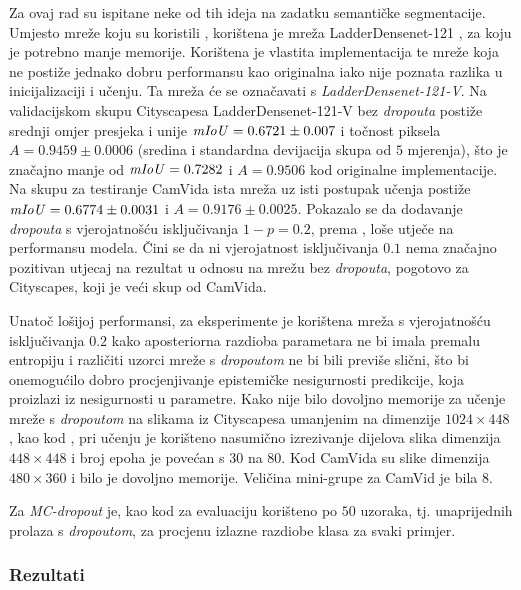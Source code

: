\documentclass[utf8, diplomski, lmodern]{fer}
\begin{document}
Za ovaj rad su ispitane neke od tih ideja na zadatku semantičke segmentacije. Umjesto mreže koju su koristili \citet{Kendall:2017:WUNBDLCV}, korištena je mreža LadderDensenet-121 \citep{Kreso:2017:LSDFSSLNI}, za koju je potrebno manje memorije. Korištena je vlastita implementacija te mreže koja ne postiže jednako dobru performansu kao originalna iako nije poznata razlika u inicijalizaciji i učenju. Ta mreža će se označavati s \textit{LadderDensenet-121-V}. Na validacijskom skupu Cityscapesa \citep{Cordts:2016:Cityscapes} LadderDensenet-121-V bez \textit{dropouta} postiže srednji omjer presjeka i unije $\mathit{mIoU}=0.6721\pm0.007$ i točnost piksela $A=0.9459\pm0.0006$ (sredina i standardna devijacija skupa od $5$ mjerenja), što je značajno manje od $\mathit{mIoU}=0.7282$ i $A=0.9506$ kod originalne implementacije. Na skupu za testiranje CamVida \citep{Brostow:2008:CamVid} ista mreža uz isti postupak učenja postiže $\mathit{mIoU}=0.6774\pm0.0031$ i $A=0.9176\pm0.0025$. Pokazalo se da dodavanje \textit{dropouta} s vjerojatnošću isključivanja $1-p=0.2$, prema \citep{Huang:2016:DCCN}, loše utječe na performansu modela. Čini se da ni vjerojatnost isključivanja $0.1$ nema značajno pozitivan utjecaj na rezultat u odnosu na mrežu bez \textit{dropouta}, pogotovo za Cityscapes, koji je veći skup od CamVida. 

Unatoč lošijoj performansi, za eksperimente je korištena mreža s vjerojatnošću isključivanja $0.2$ kako aposteriorna razdioba parametara ne bi imala premalu entropiju i različiti uzorci mreže s \textit{dropoutom} ne bi bili previše slični, što bi onemogućilo dobro procjenjivanje epistemičke nesigurnosti predikcije, koja proizlazi iz nesigurnosti u parametre. Kako nije bilo dovoljno memorije za učenje mreže s \textit{dropoutom} na slikama iz Cityscapesa umanjenim na dimenzije $1024\times448$, kao kod \citet{Kreso:2017:LSDFSSLNI}, pri učenju je korišteno nasumično izrezivanje dijelova slika dimenzija $448\times448$ i broj epoha je povećan s $30$ na $80$. Kod CamVida su slike dimenzija $480\times360$ i bilo je dovoljno memorije. Veličina mini-grupe za CamVid je bila $8$. 

Za \textit{MC-dropout} je, kao kod \cite{Kendall:2017:WUNBDLCV} za evaluaciju korišteno po $50$ uzoraka, tj. unaprijednih prolaza s \textit{dropoutom}, za procjenu izlazne razdiobe klasa za svaki primjer.

\subsubsection{Rezultati}
\end{document}
